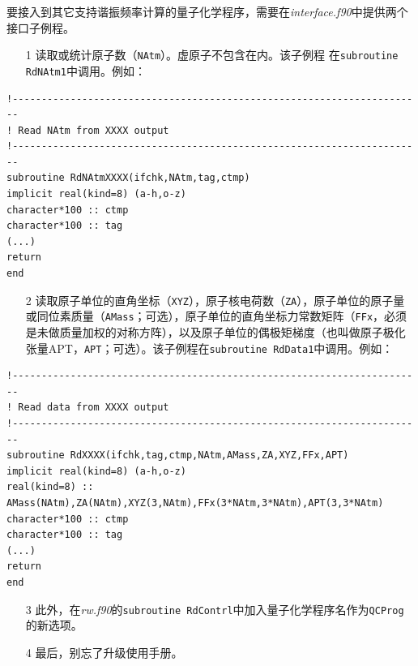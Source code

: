 \documentclass[12pt,a4paper,openany,twoside,cap]{ctexbook}
\begin{document}
要接入到其它支持谐振频率计算的量子化学程序，需要在\emph{interface.f90}中提供两个接口子例程。
\begin{enumerate}
\item[1] 读取或统计原子数（\verb|NAtm|）。虚原子不包含在内。该子例程 在\verb|subroutine RdNAtm1|中调用。例如：
\end{enumerate}
\begin{colorboxed}[oval=false,boxcolor=green!75!black,bgcolor=green!5!white]
\begin{lstlisting}[language={[90]Fortran}]
!-----------------------------------------------------------------------
! Read NAtm from XXXX output
!-----------------------------------------------------------------------
subroutine RdNAtmXXXX(ifchk,NAtm,tag,ctmp)
implicit real(kind=8) (a-h,o-z)
character*100 :: ctmp
character*100 :: tag
(...)
return
end
\end{lstlisting}\end{colorboxed}
\begin{enumerate}
\item[2] 读取原子单位的直角坐标（\verb|XYZ|），原子核电荷数（\verb|ZA|），原子单位的原子量或同位素质量（\verb|AMass|；可选），原子单位的直角坐标力常数矩阵（\verb|FFx|，必须是未做质量加权的对称方阵），以及原子单位的偶极矩梯度（也叫做原子极化张量APT，\verb|APT|；可选）。该子例程在\verb|subroutine RdData1|中调用。例如：
\end{enumerate}
\begin{colorboxed}[oval=false,boxcolor=green!75!black,bgcolor=green!5!white]
\begin{lstlisting}[language={[90]Fortran}]
!-----------------------------------------------------------------------
! Read data from XXXX output
!-----------------------------------------------------------------------
subroutine RdXXXX(ifchk,tag,ctmp,NAtm,AMass,ZA,XYZ,FFx,APT)
implicit real(kind=8) (a-h,o-z)
real(kind=8) :: AMass(NAtm),ZA(NAtm),XYZ(3,NAtm),FFx(3*NAtm,3*NAtm),APT(3,3*NAtm)
character*100 :: ctmp
character*100 :: tag
(...)
return
end
\end{lstlisting}\end{colorboxed}
\begin{enumerate}
\item[3] 此外，在\emph{rw.f90}的\verb|subroutine RdContrl|中加入量子化学程序名作为\verb|QCProg|的新选项。

\item[4] 最后，别忘了升级使用手册。
\end{enumerate}
\end{document}
